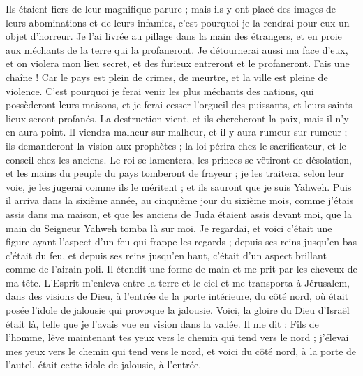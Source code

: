\begin{multicols}{2}
Ils étaient fiers de leur magnifique parure ; mais ils y ont placé des images de leurs abominations et de leurs infamies, c'est pourquoi je la rendrai pour eux un objet d'horreur.
Je l'ai livrée au pillage dans la main des étrangers, et en proie aux méchants de la terre qui la profaneront.
Je détournerai aussi ma face d'eux, et on violera mon lieu secret, et des furieux entreront et le profaneront.
Fais une chaîne ! Car le pays est plein de crimes, de meurtre, et la ville est pleine de violence.
C'est pourquoi je ferai venir les plus méchants des nations, qui possèderont leurs maisons, et je ferai cesser l'orgueil des puissants, et leurs saints lieux seront profanés.
La destruction vient, et ils chercheront la paix, mais il n'y en aura point.
Il viendra malheur sur malheur, et il y aura rumeur sur rumeur ; ils demanderont la vision aux prophètes ; la loi périra chez le sacrificateur, et le conseil chez les anciens.
Le roi se lamentera, les princes se vêtiront de désolation, et les mains du peuple du pays tomberont de frayeur ; je les traiterai selon leur voie, je les jugerai comme ils le méritent ; et ils sauront que je suis Yahweh.
\VerseOne{}Puis il arriva dans la sixième année, au cinquième jour du sixième mois, comme j'étais assis dans ma maison, et que les anciens de Juda étaient assis devant moi, que la main du Seigneur Yahweh tomba là sur moi.
Je regardai, et voici c'était une figure ayant l'aspect d'un feu qui frappe les regards ; depuis ses reins jusqu'en bas c'était du feu, et depuis ses reins jusqu'en haut, c'était d'un aspect brillant comme de l'airain poli.
Il étendit une forme de main et me prit par les cheveux de ma tête. L'Esprit m'enleva entre la terre et le ciel et me transporta à Jérusalem, dans des visions de Dieu, à l'entrée de la porte intérieure, du côté nord, où était posée l'idole de jalousie qui provoque la jalousie.
Voici, la gloire du Dieu d'Israël était là, telle que je l'avais vue en vision dans la vallée.
Il me dit : Fils de l'homme, lève maintenant tes yeux vers le chemin qui tend vers le nord ; j'élevai mes yeux vers le chemin qui tend vers le nord, et voici du côté nord, à la porte de l'autel, était cette idole de jalousie, à l'entrée.

\end{multicols}
